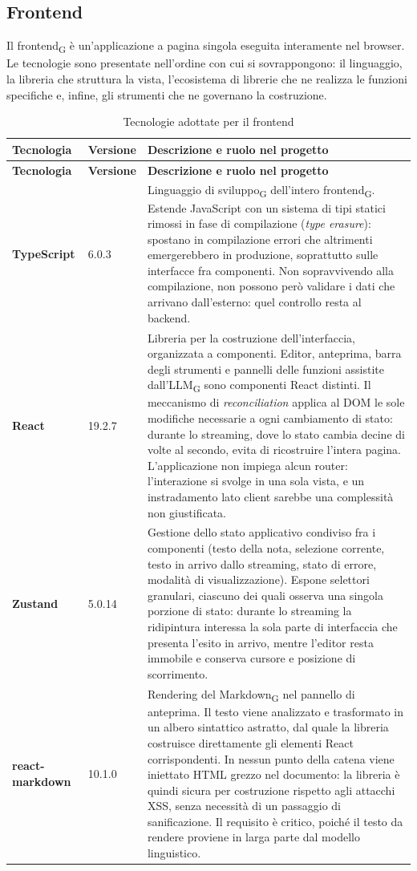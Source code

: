 \documentclass[a4paper, 10pt]{article}
\newcommand{\vTS}{6.0.3}        %
\newenvironment{tabellatec}[2]{%
  \begingroup
  \small
  \setlength{\tabcolsep}{4pt}
  \begin{longtable}{|p{2.8cm}|p{1.5cm}|p{9.2cm}|}
    \caption{#1}\label{#2}\\
    \hline
    \textbf{Tecnologia} & \textbf{Versione} & \textbf{Descrizione e ruolo nel progetto} \\
    \hline
    \endfirsthead
    \hline
    \textbf{Tecnologia} & \textbf{Versione} & \textbf{Descrizione e ruolo nel progetto} \\
    \hline
    \endhead
}{%
  \end{longtable}
  \endgroup
}
\begin{document}
\subsection{Frontend}
\label{sec:tecnologie-frontend}
Il frontend\textsubscript{G} è un'applicazione a pagina singola eseguita interamente nel browser. Le tecnologie sono presentate nell'ordine con cui si sovrappongono: il linguaggio, la libreria che struttura la vista, l'ecosistema di librerie che ne realizza le funzioni specifiche e, infine, gli strumenti che ne governano la costruzione.

\begin{tabellatec}{Tecnologie adottate per il frontend}{tab:tec-frontend}
    \textbf{TypeScript} & \vTS & Linguaggio di sviluppo\textsubscript{G} dell'intero frontend\textsubscript{G}. Estende JavaScript con un sistema di tipi statici rimossi in fase di compilazione (\textit{type erasure}): spostano in compilazione errori che altrimenti emergerebbero in produzione, soprattutto sulle interfacce fra componenti. Non sopravvivendo alla compilazione, non possono però validare i dati che arrivano dall'esterno: quel controllo resta al backend. \\ \hline

    \textbf{React} & 19.2.7 & Libreria per la costruzione dell'interfaccia, organizzata a componenti. Editor, anteprima, barra degli strumenti e pannelli delle funzioni assistite dall'LLM\textsubscript{G} sono componenti React distinti. Il meccanismo di \textit{reconciliation} applica al DOM le sole modifiche necessarie a ogni cambiamento di stato: durante lo streaming, dove lo stato cambia decine di volte al secondo, evita di ricostruire l'intera pagina. L'applicazione non impiega alcun router: l'interazione si svolge in una sola vista, e un instradamento lato client sarebbe una complessità non giustificata. \\ \hline

    \textbf{Zustand} & 5.0.14 & Gestione dello stato applicativo condiviso fra i componenti (testo della nota, selezione corrente, testo in arrivo dallo streaming, stato di errore, modalità di visualizzazione). Espone selettori granulari, ciascuno dei quali osserva una singola porzione di stato: durante lo streaming la ridipintura interessa la sola parte di interfaccia che presenta l'esito in arrivo, mentre l'editor resta immobile e conserva cursore e posizione di scorrimento. \\ \hline

    \textbf{react-markdown} & 10.1.0 & Rendering del Markdown\textsubscript{G} nel pannello di anteprima. Il testo viene analizzato e trasformato in un albero sintattico astratto, dal quale la libreria costruisce direttamente gli elementi React corrispondenti. In nessun punto della catena viene iniettato HTML grezzo nel documento: la libreria è quindi sicura per costruzione rispetto agli attacchi XSS, senza necessità di un passaggio di sanificazione. Il requisito è critico, poiché il testo da rendere proviene in larga parte dal modello linguistico. \\ \hline


\end{tabellatec}
\end{document}
